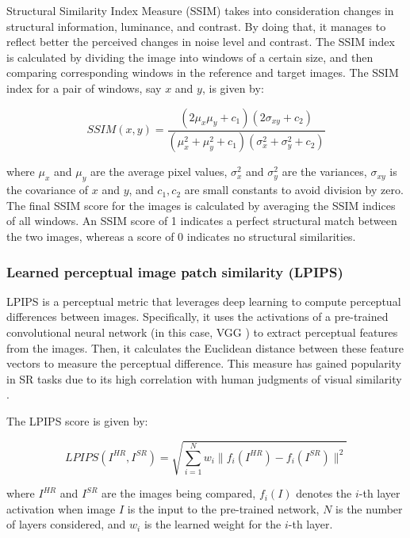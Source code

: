             
        Structural Similarity Index Measure (SSIM) takes into consideration changes in structural information, luminance, and contrast. By doing that, it manages to reflect better the perceived changes in noise level and contrast.
        The SSIM index is calculated by dividing the image into windows of a certain size, and then comparing corresponding windows in the reference and target images. The SSIM index for a pair of windows, say $x$ and $y$, is given by:
        
        \begin{equation}
            SSIM(x, y) = \frac{(2\mu_x\mu_y + c_1)(2\sigma_{xy} + c_2)}{(\mu_x^2 + \mu_y^2 + c_1)(\sigma_x^2 + \sigma_y^2 + c_2)}
        \end{equation}
        
        where $\mu_x$ and $\mu_y$ are the average pixel values, $\sigma_x^2$ and $\sigma_y^2$ are the variances, $\sigma_{xy}$ is the covariance of $x$ and $y$, and $c_1, c_2$ are small constants to avoid division by zero.
        The final SSIM score for the images is calculated by averaging the SSIM indices of all windows. An SSIM score of 1 indicates a perfect structural match between the two images, whereas a score of 0 indicates no structural similarities.

        \subsubsection{Learned perceptual image patch similarity (LPIPS)}

        LPIPS is a perceptual metric that leverages deep learning to compute perceptual differences between images. Specifically, it uses the activations of a pre-trained convolutional neural network (in this case, VGG \cite{VGGnet} ) to extract perceptual features from the images. 
        Then, it calculates the Euclidean distance between these feature vectors to measure the perceptual difference.
        This measure has gained popularity in SR tasks due to its high correlation with human judgments of visual similarity \cite{zhang2018unreasonable}.
        
        The LPIPS score is given by:
        
        \begin{equation}
        LPIPS(I^{HR}, I^{SR}) = \sqrt{\sum_{i=1}^{N} w_i\|f_i(I^{HR})-f_i(I^{SR})\|^2}
        \end{equation}
        
        where $I^{HR}$ and $I^{SR}$ are the images being compared, $f_i(I)$ denotes the $i$-th layer activation when image $I$ is the input to the pre-trained network, $N$ is the number of layers considered, and $w_i$ is the learned weight for the $i$-th layer.
        
